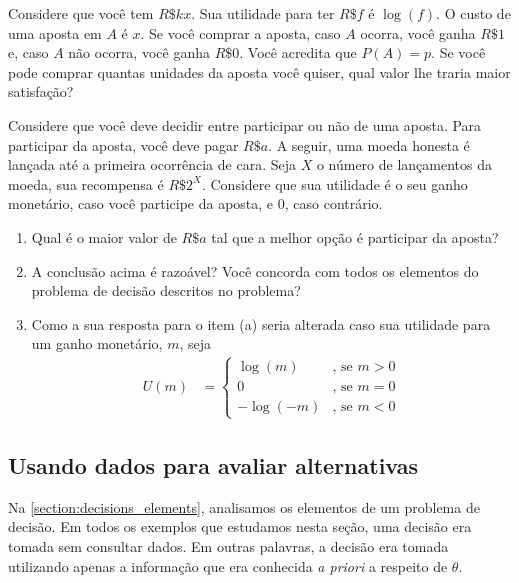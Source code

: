 \begin{exercise}
 Considere que você tem $R\$kx$.
 Sua utilidade para ter $R\$f$ é $\log(f)$.
 O custo de uma aposta em $A$ é $x$.
 Se você comprar a aposta,
 caso $A$ ocorra, você ganha $R\$1$ e,
 caso $A$ não ocorra, você ganha $R\$0$.
 Você acredita que $P(A) = p$.
 Se você pode comprar quantas unidades da
 aposta você quiser, qual valor
 lhe traria maior satisfação?
\end{exercise}

\begin{exercise}
 Considere que você deve decidir entre
 participar ou não de uma aposta.
 Para participar da aposta, 
 você deve pagar $R\$a$.
 A seguir, uma moeda honesta é lançada até a
 primeira ocorrência de cara. Seja $X$ o
 número de lançamentos da moeda,
 sua recompensa é $R\$2^{X}$.
 Considere que sua utilidade é o seu ganho monetário,
 caso você participe da aposta, e $0$, caso contrário.
 \begin{enumerate}[label=(\alph*)]
  \item Qual é o maior valor de $R\$a$ tal que
  a melhor opção é participar da aposta?
  \item A conclusão acima é razoável?
  Você concorda com todos os elementos
  do problema de decisão descritos no problema?
  \item Como a sua resposta para o item (a) seria
  alterada caso sua utilidade para
  um ganho monetário, $m$, seja
  \begin{align*}
   U(m)	&=
   \begin{cases}
    \log(m) & \text{, se $m > 0$} \\
    0 & \text{, se $m = 0$} \\
    -\log(-m) & \text{, se $m < 0$}
   \end{cases}
  \end{align*}
 \end{enumerate}
\end{exercise}

\subsection{Usando dados para avaliar alternativas}

Na \cref{section:decisions_elements},
analisamos os elementos de um problema de decisão.
Em todos os exemplos que estudamos nesta seção,
uma decisão era tomada sem consultar dados.
Em outras palavras, a decisão era tomada utilizando
apenas a informação que era conhecida \emph{a priori}
a respeito de $\theta$.


